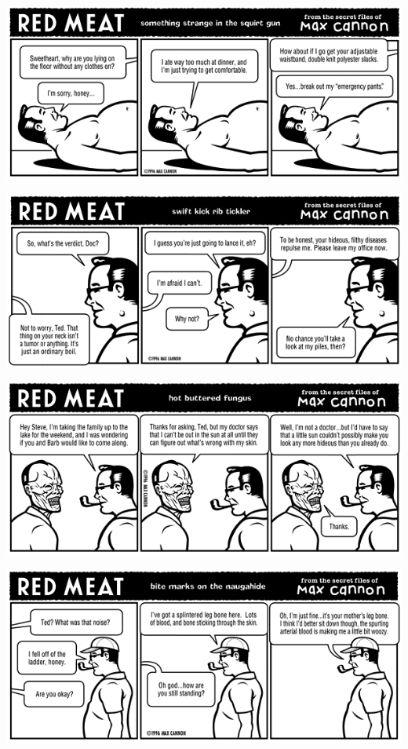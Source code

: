 \documentclass[a4paper,twoside,11pt]{article}
\begin{document}
\includegraphics[width=\textwidth]{redmeat_1996-09-02.png}



\includegraphics[width=\textwidth]{redmeat_1996-09-09.png}



\includegraphics[width=\textwidth]{redmeat_1996-09-16.png}



\includegraphics[width=\textwidth]{redmeat_1996-09-23.png}
\end{document}

